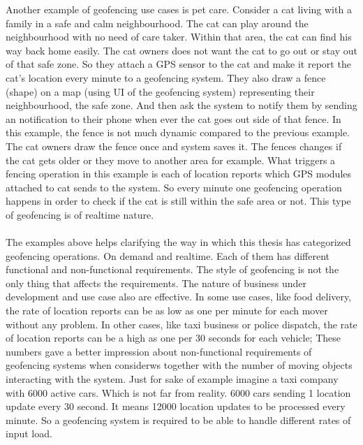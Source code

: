 \documentclass[a4]{report}
\begin{document}
    Another example of geofencing use cases is pet care\cite{pet-geofencing}.
    Consider a cat living with a family in a safe and calm neighbourhood.
    The cat can play around the neighbourhood with no need of care taker.
    Within that area, the cat can find his way back home easily.
    The cat owners does not want the cat to go out or stay out of that safe zone.
    So they attach a GPS sensor to the cat and make it report the cat's location every minute to a geofencing system.
    They also draw a fence (shape) on a map (using UI of the geofencing system) representing their neighbourhood, the
    safe zone.
    And then ask the system to notify them by sending an notification to their phone when ever the cat goes out side
    of that fence.
    In this example, the fence is not much dynamic compared to the previous example.
    The cat owners draw the fence once and system saves it.
    The fences changes if the cat gets older or they move to another area for example.
    What triggers a fencing operation in this example is each of location reports which GPS modules attached to cat
    sends to the system.
    So every minute one geofencing operation happens in order to check if the cat is still within the safe area or
    not.
    This type of geofencing is of realtime nature.

    \paragraph{}
    The examples above helps clarifying the way in which this thesis has categorized geofencing operations.
    On demand and realtime.
    Each of them has different functional and non-functional requirements.
    The style of geofencing is not the only thing that affects the requirements.
    The nature of business under development and use case also are effective.
    In some use cases, like food delivery, the rate of location reports can be as low as one per minute for each
    mover without any problem.
    In other cases, like taxi business or police dispatch, the rate of location reports can be a high as one per 30
    seconds for each vehicle;
    These numbers gave a better impression about non-functional requirements of geofencing systems when considerws
    together with the number of moving objects interacting with the system.
    Just for sake of example imagine a taxi company with 6000 active cars.
    Which is not far from reality.
    6000 cars sending 1 location update every 30 second.
    It means 12000 location updates to be processed every minute.
    So a geofencing system is required to be able to handle different rates of input load.
\end{document}
